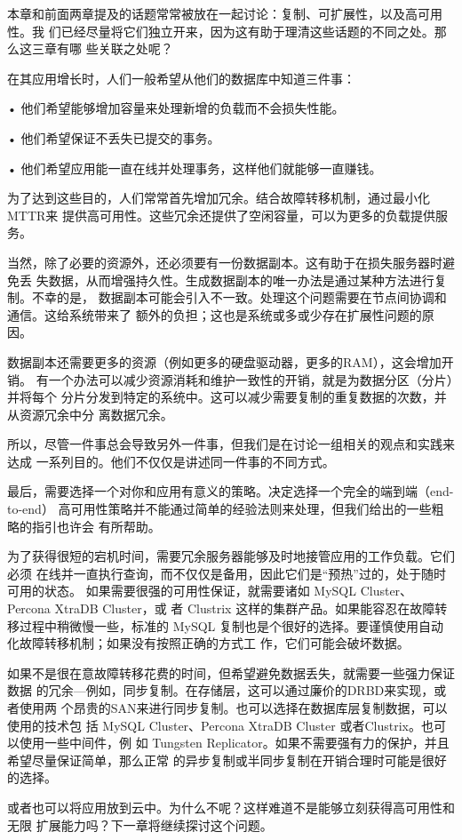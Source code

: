 本章和前面两章提及的话题常常被放在一起讨论：复制、可扩展性，以及高可用性。我
们已经尽量将它们独立开来，因为这有助于理清这些话题的不同之处。那么这三章有哪
些关联之处呢？

在其应用增长时，人们一般希望从他们的数据库中知道三件事：

• 他们希望能够增加容量来处理新增的负载而不会损失性能。

• 他们希望保证不丢失已提交的事务。

• 他们希望应用能一直在线并处理事务，这样他们就能够一直赚钱。

为了达到这些目的，人们常常首先增加冗余。结合故障转移机制，通过最小化 MTTR来
提供高可用性。这些冗余还提供了空闲容量，可以为更多的负载提供服务。

当然，除了必要的资源外，还必须要有一份数据副本。这有助于在损失服务器时避免丢
失数据，从而增强持久性。生成数据副本的唯一办法是通过某种方法进行复制。不幸的是，
数据副本可能会引入不一致。处理这个问题需要在节点间协调和通信。这给系统带来了
额外的负担；这也是系统或多或少存在扩展性问题的原因。

数据副本还需要更多的资源（例如更多的硬盘驱动器，更多的RAM），这会增加开销。
有一个办法可以减少资源消耗和维护一致性的开销，就是为数据分区（分片）并将每个
分片分发到特定的系统中。这可以减少需要复制的重复数据的次数，并从资源冗余中分
离数据冗余。

所以，尽管一件事总会导致另外一件事，但我们是在讨论一组相关的观点和实践来达成
一系列目的。他们不仅仅是讲述同一件事的不同方式。

最后，需要选择一个对你和应用有意义的策略。决定选择一个完全的端到端（end-to-end）
高可用性策略并不能通过简单的经验法则来处理，但我们给出的一些粗略的指引也许会
有所帮助。

为了获得很短的宕机时间，需要冗余服务器能够及时地接管应用的工作负载。它们必须
在线并一直执行查询，而不仅仅是备用，因此它们是“预热”过的，处于随时可用的状态。
如果需要很强的可用性保证，就需要诸如 MySQL Cluster、Percona XtraDB Cluster，或
者 Clustrix 这样的集群产品。如果能容忍在故障转移过程中稍微慢一些，标准的 MySQL
复制也是个很好的选择。要谨慎使用自动化故障转移机制；如果没有按照正确的方式工
作，它们可能会破坏数据。

如果不是很在意故障转移花费的时间，但希望避免数据丢失，就需要一些强力保证数据
的冗余—例如，同步复制。在存储层，这可以通过廉价的DRBD来实现，或者使用两
个昂贵的SAN来进行同步复制。也可以选择在数据库层复制数据，可以使用的技术包
括 MySQL Cluster、Percona XtraDB Cluster 或者Clustrix。也可以使用一些中间件，例
如 Tungsten Replicator。如果不需要强有力的保护，并且希望尽量保证简单，那么正常
的异步复制或半同步复制在开销合理时可能是很好的选择。

或者也可以将应用放到云中。为什么不呢？这样难道不是能够立刻获得高可用性和无限
扩展能力吗？下一章将继续探讨这个问题。


